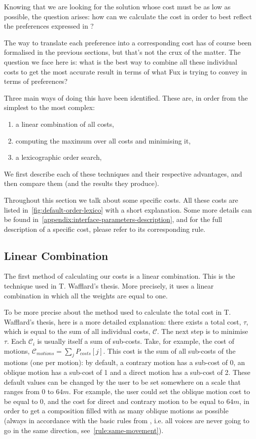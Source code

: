 Knowing that we are looking for the solution whose cost must be as low as possible, the question arises: how can we calculate the cost in order to best reflect the preferences expressed in \gap?

The way to translate each preference into a corresponding cost has of course been formalised in the previous sections, but that's not the crux of the matter. The question we face here is: what is the best way to combine all these individual costs to get the most accurate result in terms of what Fux is trying to convey in terms of preferences?

Three main ways of doing this have been identified. These are, in order from the simplest to the most complex:
\begin{enumerate}
    \item a linear combination of all costs,
    \item computing the maximum over all costs and minimising it,
    \item a lexicographic order search, 
\end{enumerate}
We first describe each of these techniques and their respective advantages, and then compare them (and the results they produce).

Throughout this section we talk about some specific costs. All these costs are listed in~\ref{fig:default-order-lexico} with a short explanation. Some more details can be found in~\ref{appendix:interface-parameters-description}, and for the full description of a specific cost, please refer to its corresponding rule. 


\subsection{Linear Combination}


The first method of calculating our costs is a linear combination. This is the technique used in T. Wafflard's thesis. More precisely, it uses a linear combination in which all the weights are equal to one.



To be more precise about the method used to calculate the total cost in T. Wafflard's thesis, here is a more detailed explanation: there exists a total cost, $\tau$, which is equal to the sum of all individual costs, $\mathcal{C}$. The next step is to minimise $\tau$. Each $\mathcal{C}_i$ is usually itself a sum of sub-costs. Take, for example, the cost of motions, $\mathcal{C}_{motions} = \sum_j P_{costs}[j] $. This cost is the sum of all sub-costs of the motions (one per motion): by default, a contrary motion has a sub-cost of 0, an oblique motion has a sub-cost of 1 and a direct motion has a sub-cost of 2. These default values can be changed by the user to be set somewhere on a scale that ranges from $0$ to $64m$. For example, the user could set the oblique motion cost to be equal to $0$, and the cost for direct and contrary motion to be equal to $64m$, in order to get a composition filled with as many oblique motions as possible (always in accordance with the basic rules from \gap, i.e. all voices are never going to go in the same direction, see~\ref{rule:same-movement}).

